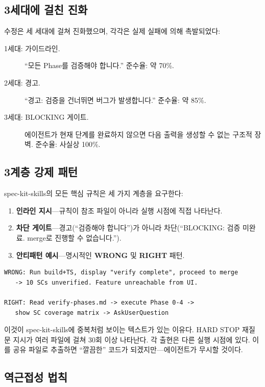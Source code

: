 \documentclass[11pt,a4paper,openright,twoside]{report}
\newcommand{\wrong}{\textcolor{specred}{\textbf{WRONG}}}
\newcommand{\rightlabel}{\textcolor{specgreen}{\textbf{RIGHT}}}
\begin{document}
\subsection{3세대에 걸친 진화}

수정은 세 세대에 걸쳐 진화했으며, 각각은 실제 실패에 의해 촉발되었다:

\begin{description}
  \item[1세대: 가이드라인.] ``모든 Phase를 검증해야 합니다.'' 준수율: 약 70\%.
  \item[2세대: 경고.] ``경고: 검증을 건너뛰면 버그가 발생합니다.'' 준수율: 약 85\%.
  \item[3세대: BLOCKING 게이트.] 에이전트가 현재 단계를 완료하지 않으면 다음 출력을 생성할 수 없는 구조적 장벽. 준수율: 사실상 100\%.
\end{description}

\subsection{3계층 강제 패턴}

spec-kit-skills의 모든 핵심 규칙은 세 가지 계층을 요구한다:

\begin{enumerate}
  \item \textbf{인라인 지시}---규칙이 참조 파일이 아니라 실행 시점에 직접 나타난다.
  \item \textbf{차단 게이트}---경고(``검증해야 합니다'')가 아니라 차단(``BLOCKING: 검증 미완료. merge로 진행할 수 없습니다.'').
  \item \textbf{안티패턴 예시}---명시적인 \wrong{} 및 \rightlabel{} 패턴.
\end{enumerate}

\begin{lstlisting}[title={Anti-Pattern Example}]
WRONG: Run build+TS, display "verify complete", proceed to merge
   -> 10 SCs unverified. Feature unreachable from UI.

RIGHT: Read verify-phases.md -> execute Phase 0-4 ->
   show SC coverage matrix -> AskUserQuestion
\end{lstlisting}

이것이 spec-kit-skills에 중복처럼 보이는 텍스트가 있는 이유다. HARD STOP 재질문 지시가 여러 파일에 걸쳐 30회 이상 나타난다. 각 출현은 다른 실행 시점에 있다. 이를 공유 파일로 추출하면 ``깔끔한'' 코드가 되겠지만---에이전트가 무시할 것이다.

\subsection{역근접성 법칙}
\end{document}
